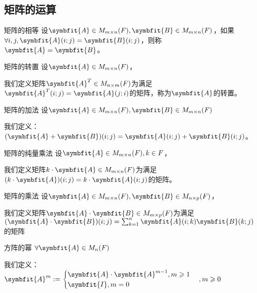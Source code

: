 \documentclass[12pt, a4paper, oneside, UTF8]{ctexbook}
\begin{document}
		\subsection{矩阵的运算}
		\begin{para}{0}
			    \begin{defn}{矩阵的相等}{}
				    设$\symbfit{A}\in M_{m\times n}(F),\symbfit{B}\in M_{m \times n}(F)$，如果$\forall i,j,\symbfit{A}(i;j)=\symbfit{B}(i;j)$，则称$\symbfit{A}=\symbfit{B}$。
				\end{defn}
				\begin{defn}{矩阵的转置}{}
				    设$\symbfit{A}\in M_{m \times n}(F)$，

					我们定义矩阵$\symbfit{A}^T \in M_{n \times m}(F)$为满足$\symbfit{A}^T(i;j)=\symbfit{A}(j;i)$的矩阵，称为$\symbfit{A}$的转置。
				\end{defn}
				\begin{defn}{矩阵的加法}{}
				    设$\symbfit{A}\in M_{m \times n}(F),\symbfit{B}\in M_{m \times n}(F)$
					
					我们定义：$(\symbfit{A}+\symbfit{B})(i;j)=\symbfit{A}(i;j)+\symbfit{B}(i;j)$。
				\end{defn}
				\begin{defn}{矩阵的纯量乘法}{}
				    设$\symbfit{A}\in M_{m \times n}(F),k \in F$，

					我们定义矩阵$k\cdot \symbfit{A} \in M_{m\times n}(F)$为满足$(k\cdot  \symbfit{A})(i;j)=k\cdot \symbfit{A}(i;j)$的矩阵。
				\end{defn}
				\begin{defn}{矩阵的乘法}{}
				    设$\symbfit{A}\in M_{m\times n}(F),\symbfit{B}\in M_{n \times p}(F)$，

					我们定义矩阵$\symbfit{A}\cdot \symbfit{B} \in M_{m\times p}(F)$为满足$(\symbfit{A}\cdot \symbfit{B})(i;j)=\sum_{k=1}^n \symbfit{A}(i;k)\symbfit{B}(k;j)$的矩阵
				\end{defn}
				\begin{defn}{方阵的幂}{}
					$\forall \symbfit{A} \in M_{n}(F)$

					我们定义：$\symbfit{A}^m:= \begin{cases}
						\symbfit{A} \cdot \symbfit{A}^{m-1},m \geqslant 1 \\
						\symbfit{I},m = 0
					\end{cases},m \geqslant 0$
				\end{defn}
				

\end{para}
\end{document}
